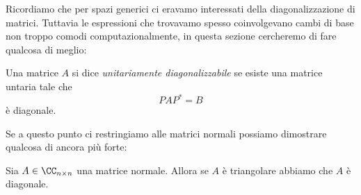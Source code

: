 \documentclass[11pt]{scrartcl}
\begin{document}
   	 Ricordiamo che per spazi generici ci eravamo interessati della diagonalizzazione di matrici. Tuttavia le espressioni che trovavamo spesso coinvolgevano cambi di base non troppo comodi computazionalmente, in questa sezione cercheremo di fare qualcosa di meglio:
   	 \begin{definition}
   	 	Una matrice $A$ si dice \textit{unitariamente diagonalizzabile} se esiste una matrice untaria tale che 
   	 	$$PAP^*=B$$
   	 	è diagonale.
   	 \end{definition}
   	 Se a questo punto ci restringiamo alle matrici normali possiamo dimostrare qualcosa di ancora più forte:
   	 \begin{lemma}
   	 	Sia $A\in \CC_{n\times n}$ una matrice normale. Allora se $A$ è triangolare abbiamo che $A$ è diagonale.
   	 \end{lemma}
\end{document}
